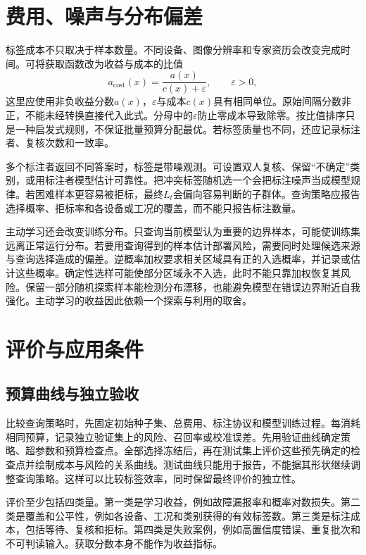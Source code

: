 \section{费用、噪声与分布偏差}

标签成本不只取决于样本数量。不同设备、图像分辨率和专家资历会改变完成时间。可将获取函数改为收益与成本的比值
\begin{equation}
 a_{\mathrm{cost}}(x)=\frac{a(x)}{c(x)+\varepsilon},
 \qquad \varepsilon>0,
 \label{eq:active-cost}
\end{equation}
这里应使用非负收益分数$a(x)$，$\varepsilon$与成本$c(x)$具有相同单位。原始间隔分数非正，不能未经转换直接代入此式。分母中的$\varepsilon$防止零成本导致除零。按比值排序只是一种启发式规则，不保证批量预算分配最优。若标签质量也不同，还应记录标注者、复核次数和一致率。

多个标注者返回不同答案时，标签是带噪观测。可设置双人复核、保留“不确定”类别，或用标注者模型估计可靠性。把冲突标签随机选一个会把标注噪声当成模型规律。若困难样本更容易被拒标，最终$L_t$会偏向容易判断的子群体。查询策略应报告选择概率、拒标率和各设备或工况的覆盖，而不能只报告标注数量。

主动学习还会改变训练分布。只查询当前模型认为重要的边界样本，可能使训练集远离正常运行分布。若要用查询得到的样本估计部署风险，需要同时处理候选来源与查询选择造成的偏差。逆概率加权要求相关区域具有正的入选概率，并记录或估计这些概率。确定性选样可能使部分区域永不入选，此时不能只靠加权恢复其风险。保留一部分随机探索样本能检测分布漂移，也能避免模型在错误边界附近自我强化。主动学习的收益因此依赖一个探索与利用的取舍。

\section{评价与应用条件}

\subsection{预算曲线与独立验收}

比较查询策略时，先固定初始种子集、总费用、标注协议和模型训练过程。每消耗相同预算，记录独立验证集上的风险、召回率或校准误差。先用验证曲线确定策略、超参数和预算检查点。全部选择冻结后，再在测试集上评价这些预先确定的检查点并绘制成本与风险的关系曲线。测试曲线只能用于报告，不能据其形状继续调整查询策略。这样可以比较标签效率，同时保留最终评价的独立性。

评价至少包括四类量。第一类是学习收益，例如故障漏报率和概率对数损失。第二类是覆盖和公平性，例如各设备、工况和类别获得的有效标签数。第三类是标注成本，包括等待、复核和拒标。第四类是失败案例，例如高置信度错误、重复批次和不可判读输入。获取分数本身不能作为收益指标。

